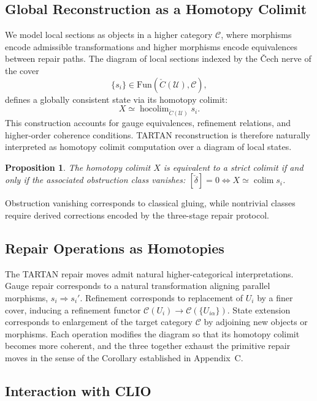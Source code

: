 \documentclass[12pt, oneside]{article}
\newtheorem{proposition}{Proposition}
\begin{document}
\subsection{Global Reconstruction as a Homotopy Colimit}

We model local sections as objects in a higher category $\mathcal{C}$, where morphisms encode admissible transformations and higher morphisms encode equivalences between repair paths. The diagram of local sections indexed by the \v{C}ech nerve of the cover
\[
\{s_i\} \in \mathrm{Fun}(\check{C}(\mathcal{U}), \mathcal{C}),
\]
defines a globally consistent state via its homotopy colimit:
\[
X \simeq \operatorname{hocolim}_{\check{C}(\mathcal{U})} s_i.
\]
This construction accounts for gauge equivalences, refinement relations, and higher-order coherence conditions. TARTAN reconstruction is therefore naturally interpreted as homotopy colimit computation over a diagram of local states.

\begin{proposition}
The homotopy colimit $X$ is equivalent to a strict colimit if and only if the associated obstruction class vanishes: $[\check{\delta}] = 0 \Longleftrightarrow X \simeq \operatorname{colim} s_i$.
\end{proposition}

Obstruction vanishing corresponds to classical gluing, while nontrivial classes require derived corrections encoded by the three-stage repair protocol.

\subsection{Repair Operations as Homotopies}

The TARTAN repair moves admit natural higher-categorical interpretations. Gauge repair corresponds to a natural transformation aligning parallel morphisms, $s_i \Rightarrow s_i'$. Refinement corresponds to replacement of $U_i$ by a finer cover, inducing a refinement functor $\mathcal{C}(U_i) \to \mathcal{C}(\{U_{i\alpha}\})$. State extension corresponds to enlargement of the target category $\mathcal{C}$ by adjoining new objects or morphisms. Each operation modifies the diagram so that its homotopy colimit becomes more coherent, and the three together exhaust the primitive repair moves in the sense of the Corollary established in Appendix~C.

\subsection{Interaction with CLIO}
\end{document}
